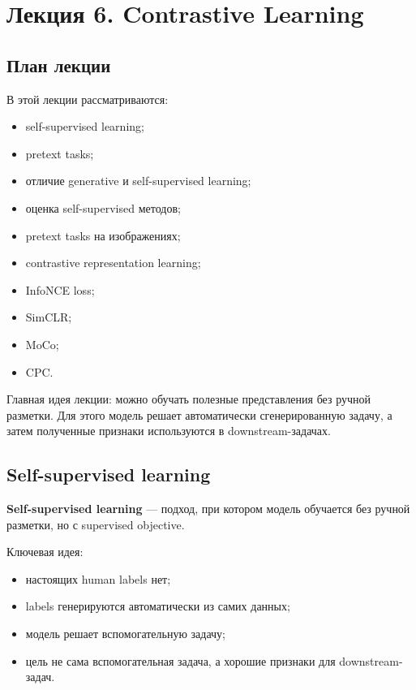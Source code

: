 \documentclass[a4paper,12pt]{article}
\begin{document}
\section{Лекция 6. Contrastive Learning}

\subsection{План лекции}

В этой лекции рассматриваются:

\begin{itemize}
    \item self-supervised learning;
    \item pretext tasks;
    \item отличие generative и self-supervised learning;
    \item оценка self-supervised методов;
    \item pretext tasks на изображениях;
    \item contrastive representation learning;
    \item InfoNCE loss;
    \item SimCLR;
    \item MoCo;
    \item CPC.
\end{itemize}

Главная идея лекции: можно обучать полезные представления без ручной разметки. Для этого модель решает автоматически сгенерированную задачу, а затем полученные признаки используются в downstream-задачах.

\subsection{Self-supervised learning}

\textbf{Self-supervised learning} --- подход, при котором модель обучается без ручной разметки, но с supervised objective.

Ключевая идея:

\begin{itemize}
    \item настоящих human labels нет;
    \item labels генерируются автоматически из самих данных;
    \item модель решает вспомогательную задачу;
    \item цель не сама вспомогательная задача, а хорошие признаки для downstream-задач.
\end{itemize}
\end{document}
